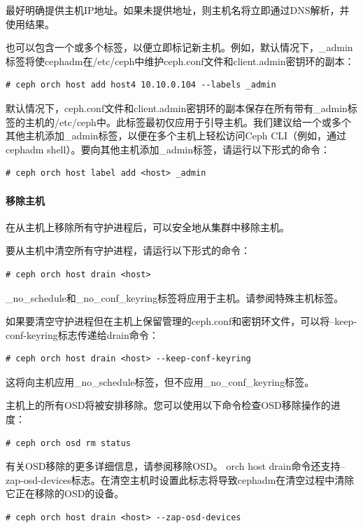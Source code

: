 \documentclass[12pt,UTF8]{ctexbook}
\begin{document}
最好明确提供主机IP地址。如果未提供地址，则主机名将立即通过DNS解析，并使用结果。

也可以包含一个或多个标签，以便立即标记新主机。例如，默认情况下，_admin标签将使cephadm在/etc/ceph中维护ceph.conf文件和client.admin密钥环的副本：
\begin{verbatim}
# ceph orch host add host4 10.10.0.104 --labels _admin
\end{verbatim}

默认情况下，ceph.conf文件和client.admin密钥环的副本保存在所有带有_admin标签的主机的/etc/ceph中。此标签最初仅应用于引导主机。我们建议给一个或多个其他主机添加_admin标签，以便在多个主机上轻松访问Ceph CLI（例如，通过cephadm shell）。要向其他主机添加_admin标签，请运行以下形式的命令：
\begin{verbatim}
# ceph orch host label add <host> _admin
\end{verbatim}

\paragraph{移除主机}

在从主机上移除所有守护进程后，可以安全地从集群中移除主机。

要从主机中清空所有守护进程，请运行以下形式的命令：
\begin{verbatim}
# ceph orch host drain <host>
\end{verbatim}

_no_schedule和_no_conf_keyring标签将应用于主机。请参阅特殊主机标签。

如果要清空守护进程但在主机上保留管理的ceph.conf和密钥环文件，可以将--keep-conf-keyring标志传递给drain命令：
\begin{verbatim}
# ceph orch host drain <host> --keep-conf-keyring
\end{verbatim}

这将向主机应用_no_schedule标签，但不应用_no_conf_keyring标签。

主机上的所有OSD将被安排移除。您可以使用以下命令检查OSD移除操作的进度：
\begin{verbatim}
# ceph orch osd rm status
\end{verbatim}

有关OSD移除的更多详细信息，请参阅移除OSD。
orch host drain命令还支持--zap-osd-devices标志。在清空主机时设置此标志将导致cephadm在清空过程中清除它正在移除的OSD的设备。
\begin{verbatim}
# ceph orch host drain <host> --zap-osd-devices
\end{verbatim}
\end{document}
